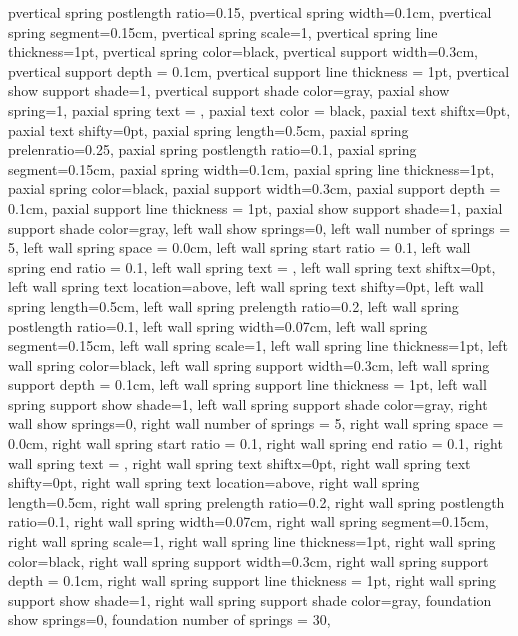 {{  pvertical spring postlength ratio=0.15,
  pvertical spring width=0.1cm,
  pvertical spring segment=0.15cm,
  pvertical spring scale=1,
  pvertical spring line thickness=1pt,
  pvertical spring color=black,
  pvertical support width=0.3cm,
  pvertical support depth = 0.1cm,
  pvertical support line thickness = 1pt,
  pvertical show support shade=1,
  pvertical support shade color=gray,
  paxial show spring=1,
  paxial spring text = {},
  paxial text color = black,
  paxial text shiftx=0pt,
  paxial text shifty=0pt,
  paxial spring length=0.5cm,
  paxial spring prelenratio=0.25,
  paxial spring postlength ratio=0.1,
  paxial spring segment=0.15cm,
  paxial spring width=0.1cm,
  paxial spring line thickness=1pt,
  paxial spring color=black,
  paxial support width=0.3cm,
  paxial support depth = 0.1cm,
  paxial support line thickness = 1pt,
  paxial show support shade=1,
  paxial support shade color=gray,
  left wall show springs=0,
  left wall number of springs = 5,
  left wall spring space = 0.0cm,
  left wall spring start ratio = 0.1,
  left wall spring end ratio = 0.1,
  left wall spring text = {},
  left wall spring text shiftx=0pt,
  left wall spring text location=above,
  left wall spring text shifty=0pt,
  left wall spring length=0.5cm,
  left wall spring prelength ratio=0.2,
  left wall spring postlength ratio=0.1,
  left wall spring width=0.07cm,
  left wall spring segment=0.15cm,
  left wall spring scale=1,
  left wall spring line thickness=1pt,
  left wall spring color=black,
  left wall spring support width=0.3cm,
  left wall spring support depth = 0.1cm,
  left wall spring support line thickness = 1pt,
  left wall spring support show shade=1,
  left wall spring support shade color=gray,
  right wall show springs=0,
  right wall number of springs = 5,
  right wall spring space = 0.0cm,
  right wall spring start ratio = 0.1,
  right wall spring end ratio = 0.1,
  right wall spring text = {},
  right wall spring text shiftx=0pt,
  right wall spring text shifty=0pt,
  right wall spring text location=above,
  right wall spring length=0.5cm,
  right wall spring prelength ratio=0.2,
  right wall spring postlength ratio=0.1,
  right wall spring width=0.07cm,
  right wall spring segment=0.15cm,
  right wall spring scale=1,
  right wall spring line thickness=1pt,
  right wall spring color=black,
  right wall spring support width=0.3cm,
  right wall spring support depth = 0.1cm,
  right wall spring support line thickness = 1pt,
  right wall spring support show shade=1,
  right wall spring support shade color=gray,
  foundation show springs=0,
  foundation number of springs = 30,
}}

